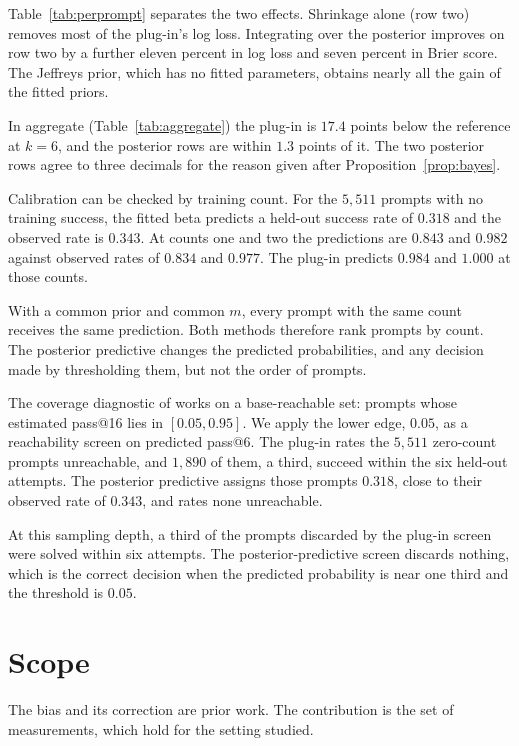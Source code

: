 \documentclass[11pt]{article}
\theoremstyle{itheads}
\begin{document}
Table~\ref{tab:perprompt} separates the two effects. Shrinkage alone
(row two) removes most of the plug-in's log loss. Integrating over
the posterior improves on row two by a further eleven percent in log
loss and seven percent in Brier score. The Jeffreys prior, which has
no fitted parameters, obtains nearly all the gain of the fitted
priors.

In aggregate (Table~\ref{tab:aggregate}) the plug-in is $17.4$
points below the reference at $k=6$, and the posterior rows are
within $1.3$ points of it. The two posterior rows agree to three
decimals for the reason given after Proposition~\ref{prop:bayes}.

Calibration can be checked by training count. For the $5{,}511$
prompts with no training success, the fitted beta predicts a
held-out success rate of $0.318$ and the observed rate is $0.343$.
At counts one and two the predictions are $0.843$ and $0.982$
against observed rates of $0.834$ and $0.977$. The plug-in predicts
$0.984$ and $1.000$ at those counts.

With a common prior and common $m$, every prompt with the same count
receives the same prediction. Both methods therefore rank prompts by
count. The posterior predictive changes the predicted probabilities,
and any decision made by thresholding them, but not the order of
prompts.

The coverage diagnostic of \citet{malladi2026} works on a
base-reachable set: prompts whose estimated pass@16 lies in
$[0.05, 0.95]$. We apply the lower edge, $0.05$, as a reachability
screen on predicted pass@6. The plug-in rates the $5{,}511$
zero-count prompts unreachable, and $1{,}890$ of them, a third,
succeed within the six held-out attempts. The posterior predictive
assigns those prompts $0.318$, close to their observed rate of
$0.343$, and rates none unreachable.

At this sampling depth, a third of the prompts discarded by the
plug-in screen were solved within six attempts. The
posterior-predictive screen discards nothing, which is the correct
decision when the predicted probability is near one third and the
threshold is $0.05$.

\section{Scope}

The bias and its correction are prior work. The contribution is the
set of measurements, which hold for the setting studied.
\end{document}
